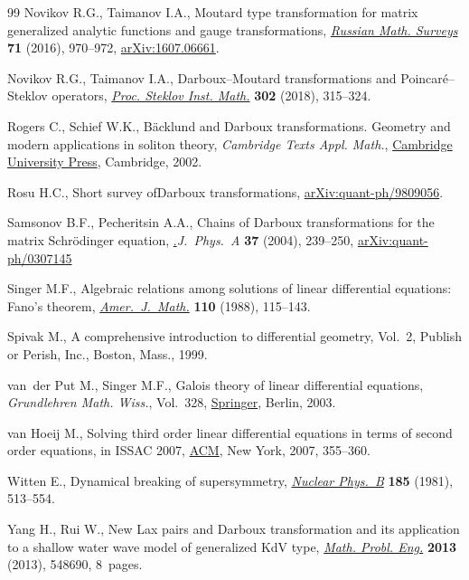 \begin{thebibliography}{99}
Novikov R.G., Taimanov I.A., {M}outard type transformation for matrix
 generalized analytic functions and gauge transformations, \href{https://doi.org/10.1070/RM9741}{\textit{Russian
 Math. Surveys}} \textbf{71} (2016), 970--972, \href{https://arxiv.org/abs/1607.06661}{arXiv:1607.06661}.

Novikov R.G., Taimanov I.A., Darboux--{M}outard transformations and
 {P}oincar\'e--{S}teklov operators, \href{https://doi.org/10.1134/S0081543818060160}{\textit{Proc. Steklov Inst. Math.}}
 \textbf{302} (2018), 315--324.

Rogers C., Schief W.K., B\"acklund and {D}arboux transformations. {G}eometry
 and modern applications in soliton theory, \textit{Cambridge Texts Appl. Math.}, \href{https://doi.org/10.1017/CBO9780511606359}{Cambridge University Press}, Cambridge, 2002.

Rosu H.C., Short survey of{D}arboux transformations, \href{https://arxiv.org/abs/quant-ph/9809056}{arXiv:quant-ph/9809056}.

Samsonov B.F., Pecheritsin A.A., Chains of {D}arboux transformations for the
 matrix {S}chr\"odinger equation, \href{https://doi.org/10.1088/0305-4470/37/1/016}.{\textit{J.~Phys.~A}} \textbf{37} (2004),
 239--250, \href{https://arxiv.org/abs/quant-ph/0307145}{arXiv:quant-ph/0307145}

Singer M.F., Algebraic relations among solutions of linear differential
 equations: {F}ano's theorem, \href{https://doi.org/10.2307/2374541}{\textit{Amer.~J.~Math.}} \textbf{110} (1988),
 115--143.

Spivak M., A comprehensive introduction to differential geometry, {V}ol.~2,
 Publish or Perish, Inc., Boston, Mass., 1999.

van~der Put M., Singer M.F., Galois theory of linear differential equations,
 \textit{Grundlehren Math. Wiss.}, Vol.~328, \href{https://doi.org/10.1007/978-3-642-55750-7}{Springer}, Berlin, 2003.

van Hoeij M., Solving third order linear differential equations in terms of
 second order equations, in I{SSAC} 2007, \href{https://doi.org/10.1145/1277548.1277596}{ACM}, New York, 2007, 355--360.

Witten E., Dynamical breaking of supersymmetry, \href{https://doi.org/10.1016/0550-3213(81)90006-7}{\textit{Nuclear Phys.~B}}
 \textbf{185} (1981), 513--554.

Yang H., Rui W., New {L}ax pairs and {D}arboux transformation and its
 application to a shallow water wave model of generalized {K}d{V} type,
 \href{https://doi.org/10.1155/2013/548690}{\textit{Math. Probl. Eng.}} \textbf{2013} (2013), 548690, 8~pages.

\end{thebibliography}
